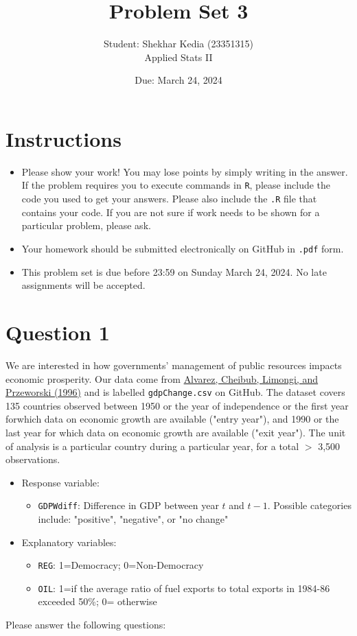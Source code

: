 \documentclass[12pt,letterpaper]{article}
\title{Problem Set 3}
\date{Due: March 24, 2024}
\author{Student: Shekhar Kedia (23351315)\\Applied Stats II}
\begin{document}
	\maketitle
	\section*{Instructions}
	\begin{itemize}
	\item Please show your work! You may lose points by simply writing in the answer. If the problem requires you to execute commands in \texttt{R}, please include the code you used to get your answers. Please also include the \texttt{.R} file that contains your code. If you are not sure if work needs to be shown for a particular problem, please ask.
\item Your homework should be submitted electronically on GitHub in \texttt{.pdf} form.
\item This problem set is due before 23:59 on Sunday March 24, 2024. No late assignments will be accepted.
	\end{itemize}

	\vspace{.25cm}
\section*{Question 1}
\vspace{.25cm}
\noindent We are interested in how governments' management of public resources impacts economic prosperity. Our data come from \href{https://www.researchgate.net/profile/Adam_Przeworski/publication/240357392_Classifying_Political_Regimes/links/0deec532194849aefa000000/Classifying-Political-Regimes.pdf}{Alvarez, Cheibub, Limongi, and Przeworski (1996)} and is labelled \texttt{gdpChange.csv} on GitHub. The dataset covers 135 countries observed between 1950 or the year of independence or the first year forwhich data on economic growth are available ("entry year"), and 1990 or the last year for which data on economic growth are available ("exit year"). The unit of analysis is a particular country during a particular year, for a total $>$ 3,500 observations. 

\begin{itemize}
	\item
	Response variable: 
	\begin{itemize}
		\item \texttt{GDPWdiff}: Difference in GDP between year $t$ and $t-1$. Possible categories include: "positive", "negative", or "no change"
	\end{itemize}
	\item
	Explanatory variables: 
	\begin{itemize}
		\item
		\texttt{REG}: 1=Democracy; 0=Non-Democracy
		\item
		\texttt{OIL}: 1=if the average ratio of fuel exports to total exports in 1984-86 exceeded 50\%; 0= otherwise
	\end{itemize}
	
\end{itemize}
\newpage
\noindent Please answer the following questions:
\end{document}
